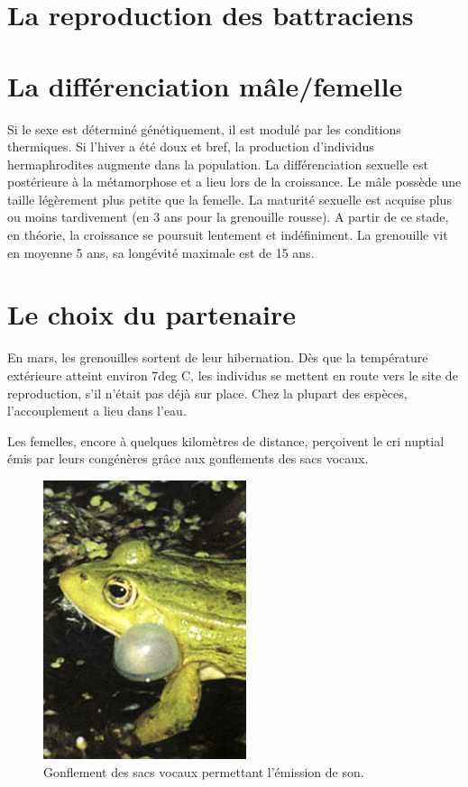\section{La reproduction des battraciens}



\section{La différenciation mâle/femelle}

Si le sexe est déterminé génétiquement, il est modulé par les conditions thermiques. Si l’hiver a été doux et bref, la production d’individus hermaphrodites augmente dans la population.
La différenciation sexuelle est postérieure à la métamorphose et a lieu lors de la croissance.
Le mâle possède une taille légèrement plus petite que la femelle.
La maturité sexuelle est acquise plus ou moins tardivement (en 3 ans pour la grenouille rousse). A partir de ce stade, en théorie, la croissance se poursuit lentement et indéfiniment. La grenouille vit en moyenne 5 ans, sa longévité maximale est de 15 ans.
        
\section{Le choix du partenaire}
En mars, les grenouilles sortent de leur hibernation.  Dès que la température extérieure atteint environ 7deg C, les individus se mettent en route vers le site de reproduction, s’il n’était pas déjà sur place. Chez la plupart des espèces, l’accouplement a lieu dans l’eau.

Les femelles, encore à quelques kilomètres de distance, perçoivent le cri nuptial émis par leurs congénères grâce aux gonflements des sacs vocaux.


\begin{figure}%
	\begin{center}
	\includegraphics[width=.5\textwidth]{laRepro/sacvocal.jpg}	
	\end{center}
	\caption{Gonflement des sacs vocaux permettant l'émission de son.}%
	\label{fig:grossejoue}%
\end{figure}


